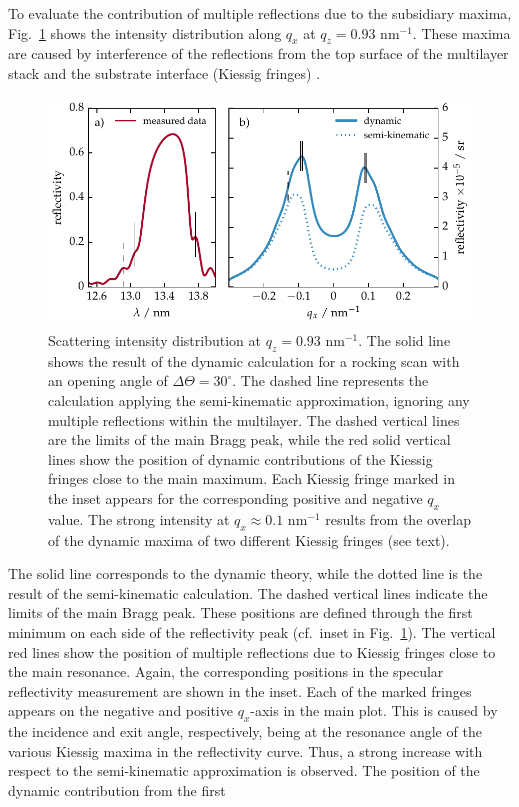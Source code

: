 To evaluate the contribution of multiple reflections due to the subsidiary maxima, Fig.~\ref{fig:kiessig_like_peak} shows the intensity distribution along $q_x$ at $q_z=0.93$ nm$^{-1}$.  These maxima are caused by interference of the reflections from the top surface of the multilayer stack and the substrate interface (Kiessig fringes) \cite{kiessig_interferenz_1931}.
\begin{figure}[htbp]
        \includegraphics[width=\textwidth]{img/qx_kinematic_vs_dynamic}
        \caption{Scattering intensity distribution at $q_z=0.93$ nm$^{-1}$. The solid line shows the result of the dynamic calculation for a rocking scan with an opening angle of $\Delta\Theta=30^\circ$. The dashed line represents the calculation applying the semi-kinematic approximation, ignoring any multiple reflections within the multilayer. The dashed vertical lines are the limits of the main Bragg peak, while the red solid vertical lines show the position of dynamic contributions of the Kiessig fringes close to the main maximum. Each Kiessig fringe marked in the inset appears for the corresponding positive and negative $q_x$ value. The strong intensity at $q_x\approx0.1$ nm$^{-1}$ results from the overlap of the dynamic maxima of two different Kiessig fringes (see text).} \label{fig:kiessig_like_peak} 
\end{figure}
The solid line corresponds to the dynamic theory, while the dotted line is the result of the semi-kinematic calculation. The dashed vertical lines indicate the limits of the main Bragg peak. These positions are defined through the first minimum on each side of the reflectivity peak (cf.~inset in Fig.~\ref{fig:kiessig_like_peak}). The vertical red lines show the position of multiple reflections due to Kiessig fringes close to the main resonance. Again, the corresponding positions in the specular reflectivity measurement are shown in the inset. Each of the marked fringes appears on the negative and positive $q_x$-axis in the main plot. This is caused by the incidence and exit angle, respectively, being at the resonance angle of the various Kiessig maxima in the reflectivity curve. Thus, a strong increase with respect to the semi-kinematic approximation is observed. The position of the dynamic contribution from the first 

